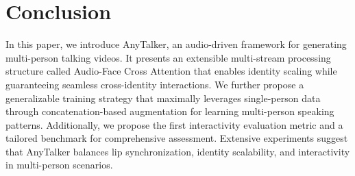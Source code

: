 \section{Conclusion}
\label{sec:conclusion}
In this paper, we introduce AnyTalker, an audio-driven framework for generating multi-person talking videos. 
It presents an extensible multi-stream processing structure called Audio-Face Cross Attention that enables identity scaling while guaranteeing seamless cross-identity interactions. 
We further propose a generalizable training strategy that maximally leverages single-person data through concatenation-based augmentation for learning multi-person speaking patterns.
Additionally, we propose the first interactivity evaluation metric and a tailored benchmark for comprehensive assessment. 
Extensive experiments suggest that AnyTalker balances lip synchronization, identity scalability, and interactivity in multi-person scenarios.